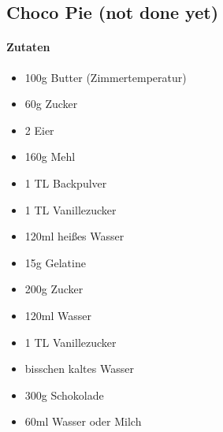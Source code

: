 \newpage
\subsection{Choco Pie (not done yet)}
\paragraph{Zutaten}
\begin{itemize}[noitemsep]
	\item 100g Butter (Zimmertemperatur)
	\item 60g Zucker
	\item 2 Eier 
	\item 160g Mehl
	\item 1 TL Backpulver
	\item 1 TL Vanillezucker 
	\vspace{0.5cm}
	\item 120ml heißes Wasser
	\item 15g Gelatine
	\item 200g Zucker
	\item 120ml Wasser
	\item 1 TL Vanillezucker
	\item bisschen kaltes Wasser
	\vspace{0.5cm}
	\item 300g Schokolade
	\item 60ml Wasser oder Milch
\end{itemize}

